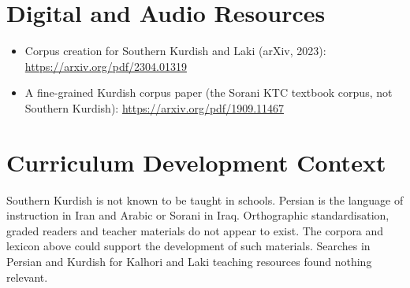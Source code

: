 \documentclass[12pt]{article}
\begin{document}
\section{Digital and Audio Resources}
\begin{itemize}
\item Corpus creation for Southern Kurdish and Laki (arXiv, 2023): \url{https://arxiv.org/pdf/2304.01319}
\item A fine-grained Kurdish corpus paper (the Sorani KTC textbook corpus, not Southern Kurdish): \url{https://arxiv.org/pdf/1909.11467}
\end{itemize}

\section{Curriculum Development Context}
Southern Kurdish is not known to be taught in schools. Persian is the language of instruction in Iran and Arabic or Sorani in Iraq. Orthographic standardisation, graded readers and teacher materials do not appear to exist. The corpora and lexicon above could support the development of such materials. Searches in Persian and Kurdish for Kalhori and Laki teaching resources found nothing relevant.
\end{document}
